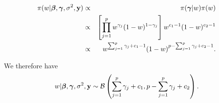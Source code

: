 \documentclass[]{book}
\begin{document}
\begin{eqnarray*}
\pi(w|{\boldsymbol \beta},{\boldsymbol \gamma},\sigma^2,{\bf y})&\propto& \pi({\boldsymbol \gamma}|w) \pi(w)\\
&\propto&\left[ \prod_{j=1}^p w^{\gamma_j}(1-w)^{1-\gamma_j}\right] w^{c_1-1}(1-w)^{c_2-1}\\
&\propto& w^{\sum_{j=1}^p \gamma_j+c_1-1}(1-w)^{p-\sum_{j=1}^p \gamma_j+c_2-1}.
\end{eqnarray*}

We therefore have
\[w|{\boldsymbol \beta},{\boldsymbol \gamma},\sigma^2,{\bf y}\sim \mathcal{B}\left(\sum_{j=1}^p \gamma_j+c_1,p-\sum_{j=1}^p \gamma_j+c_2\right).\]


\end{document}
